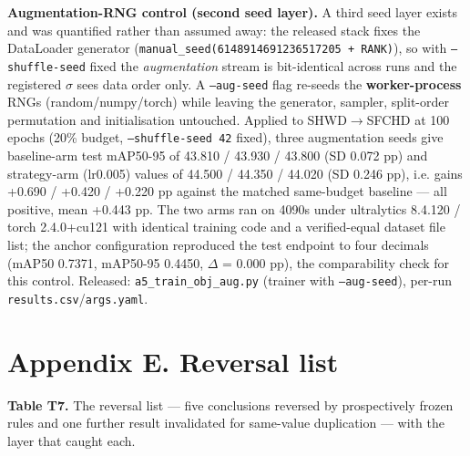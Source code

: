 \documentclass[pdflatex,sn-mathphys-ay]{sn-jnl}
\begin{document}
\textbf{Augmentation-RNG control (second seed layer).} A third seed layer exists and was quantified rather than assumed away: the released stack fixes the DataLoader generator (\texttt{manual\_seed(6148914691236517205 + RANK)}), so with \texttt{--shuffle-seed} fixed the \emph{augmentation} stream is bit-identical across runs and the registered \ensuremath{\sigma} sees data order only. A \texttt{--aug-seed} flag re-seeds the \textbf{worker-process} RNGs (random/numpy/torch) while leaving the generator, sampler, split-order permutation and initialisation untouched. Applied to SHWD\ensuremath{\rightarrow}SFCHD at 100 epochs (20\% budget, \texttt{--shuffle-seed 42} fixed), three augmentation seeds give baseline-arm test mAP50-95 of 43.810 / 43.930 / 43.800 (SD 0.072 pp) and strategy-arm (lr0.005) values of 44.500 / 44.350 / 44.020 (SD 0.246 pp), i.e. gains +0.690 / +0.420 / +0.220 pp against the matched same-budget baseline --- all positive, mean +0.443 pp. The two arms ran on 4090s under ultralytics 8.4.120 \citep{bjorck2025} / torch 2.4.0+cu121 with identical training code and a verified-equal dataset file list; the anchor configuration reproduced the test endpoint to four decimals (mAP50 0.7371, mAP50-95 0.4450, \ensuremath{\Delta} = 0.000 pp), the comparability check for this control. Released: \texttt{a5\_train\_obj\_aug.py} (trainer with \texttt{--aug-seed}), per-run \texttt{results.csv}/\texttt{args.yaml}.

\section*{Appendix E. Reversal list}

\textbf{Table T7.} The reversal list --- five conclusions reversed by prospectively frozen rules and one further result invalidated for same-value duplication --- with the layer that caught each.
\end{document}
